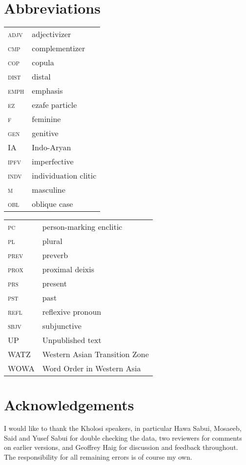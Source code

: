 \documentclass[output=paper,colorlinks,citecolor=brown]{langscibook}
\begin{document}
\section*{Abbreviations}
\begin{tabularx}{.45\textwidth}{lQ}
\textsc{adjv} & adjectivizer \\
\textsc{cmp} & complementizer \\
\textsc{cop} & {copula} \\
\textsc{dist} & distal \\
\textsc{emph} & {emphasis} \\
\textsc{ez} & ezafe particle \\
\textsc{f} & feminine \\
\textsc{gen} & genitive \\
IA & Indo-Aryan \\
\textsc{ipfv} & imperfective \\
\textsc{indv} & individuation {clitic} \\
\textsc{m} & masculine \\
\textsc{obl} & {oblique} case \\
\end{tabularx}
\begin{tabularx}{.48\textwidth}{lQ}
\textsc{pc} & person-marking enclitic \\
\textsc{pl} & plural \\
\textsc{prev} & preverb\\
\textsc{prox} & proximal deixis \\
\textsc{prs} & present\\
\textsc{pst} & past \\
\textsc{refl} & reflexive {pronoun} \\
\textsc{sbjv} & subjunctive \\
UP & Unpublished text \\
WATZ & Western Asian Transition Zone\\
WOWA & Word Order in {\hspace{.5cm}} Western Asia \\
\end{tabularx}

\section*{Acknowledgements}

I would like to thank the Kholosi speakers, in particular Hawa Sabui, Mosaeeb, Said and Yusef Sabui for double checking the data, two reviewers for comments on earlier versions, and Geoffrey Haig for discussion and feedback throughout. The responsibility for all remaining errors is of course my own. 

\sloppy
\printbibliography[heading=subbibliography,notkeyword=this]
\end{document}
